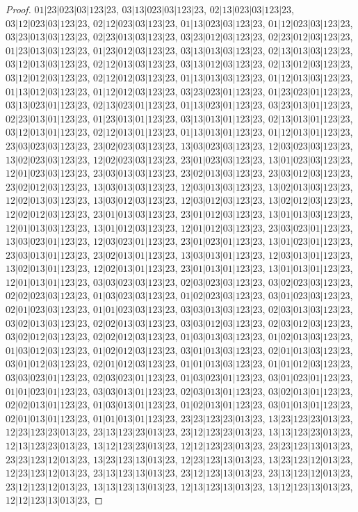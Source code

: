 \documentclass[12pt]{article}
\theoremstyle{plain}
\theoremstyle{definition}
\theoremstyle{remark}
\begin{document}
\begin{proof}
$01|23|023|03|123|23$, $03|13|023|03|123|23$, $02|13|023|03|123|23$, $03|12|023|03|123|23$, $02|12|023|03|123|23$, $01|13|023|03|123|23$, $01|12|023|03|123|23$, $03|23|013|03|123|23$, $02|23|013|03|123|23$, $03|23|012|03|123|23$, $02|23|012|03|123|23$, $01|23|013|03|123|23$, $01|23|012|03|123|23$, $03|13|013|03|123|23$, $02|13|013|03|123|23$, $03|12|013|03|123|23$, $02|12|013|03|123|23$, $03|13|012|03|123|23$, $02|13|012|03|123|23$, $03|12|012|03|123|23$, $02|12|012|03|123|23$, $01|13|013|03|123|23$, $01|12|013|03|123|23$, $01|13|012|03|123|23$, $01|12|012|03|123|23$, $03|23|023|01|123|23$, $01|23|023|01|123|23$, $03|13|023|01|123|23$, $02|13|023|01|123|23$, $01|13|023|01|123|23$, $03|23|013|01|123|23$, $02|23|013|01|123|23$, $01|23|013|01|123|23$, $03|13|013|01|123|23$, $02|13|013|01|123|23$, $03|12|013|01|123|23$, $02|12|013|01|123|23$, $01|13|013|01|123|23$, $01|12|013|01|123|23$, $23|03|023|03|123|23$, $23|02|023|03|123|23$, $13|03|023|03|123|23$, $12|03|023|03|123|23$, $13|02|023|03|123|23$, $12|02|023|03|123|23$, $23|01|023|03|123|23$, $13|01|023|03|123|23$, $12|01|023|03|123|23$, $23|03|013|03|123|23$, $23|02|013|03|123|23$, $23|03|012|03|123|23$, $23|02|012|03|123|23$, $13|03|013|03|123|23$, $12|03|013|03|123|23$, $13|02|013|03|123|23$, $12|02|013|03|123|23$, $13|03|012|03|123|23$, $12|03|012|03|123|23$, $13|02|012|03|123|23$, $12|02|012|03|123|23$, $23|01|013|03|123|23$, $23|01|012|03|123|23$, $13|01|013|03|123|23$, $12|01|013|03|123|23$, $13|01|012|03|123|23$, $12|01|012|03|123|23$, $23|03|023|01|123|23$, $13|03|023|01|123|23$, $12|03|023|01|123|23$, $23|01|023|01|123|23$, $13|01|023|01|123|23$, $23|03|013|01|123|23$, $23|02|013|01|123|23$, $13|03|013|01|123|23$, $12|03|013|01|123|23$, $13|02|013|01|123|23$, $12|02|013|01|123|23$, $23|01|013|01|123|23$, $13|01|013|01|123|23$, $12|01|013|01|123|23$, $03|03|023|03|123|23$, $02|03|023|03|123|23$, $03|02|023|03|123|23$, $02|02|023|03|123|23$, $01|03|023|03|123|23$, $01|02|023|03|123|23$, $03|01|023|03|123|23$, $02|01|023|03|123|23$, $01|01|023|03|123|23$, $03|03|013|03|123|23$, $02|03|013|03|123|23$, $03|02|013|03|123|23$, $02|02|013|03|123|23$, $03|03|012|03|123|23$, $02|03|012|03|123|23$, $03|02|012|03|123|23$, $02|02|012|03|123|23$, $01|03|013|03|123|23$, $01|02|013|03|123|23$, $01|03|012|03|123|23$, $01|02|012|03|123|23$, $03|01|013|03|123|23$, $02|01|013|03|123|23$, $03|01|012|03|123|23$, $02|01|012|03|123|23$, $01|01|013|03|123|23$, $01|01|012|03|123|23$, $03|03|023|01|123|23$, $02|03|023|01|123|23$, $01|03|023|01|123|23$, $03|01|023|01|123|23$, $01|01|023|01|123|23$, $03|03|013|01|123|23$, $02|03|013|01|123|23$, $03|02|013|01|123|23$, $02|02|013|01|123|23$, $01|03|013|01|123|23$, $01|02|013|01|123|23$, $03|01|013|01|123|23$, $02|01|013|01|123|23$, $01|01|013|01|123|23$, $23|23|123|23|013|23$, $13|23|123|23|013|23$, $12|23|123|23|013|23$, $23|13|123|23|013|23$, $23|12|123|23|013|23$, $13|13|123|23|013|23$, $12|13|123|23|013|23$, $13|12|123|23|013|23$, $12|12|123|23|013|23$, $23|23|123|13|013|23$, $23|23|123|12|013|23$, $13|23|123|13|013|23$, $12|23|123|13|013|23$, $13|23|123|12|013|23$, $12|23|123|12|013|23$, $23|13|123|13|013|23$, $23|12|123|13|013|23$, $23|13|123|12|013|23$, $23|12|123|12|013|23$, $13|13|123|13|013|23$, $12|13|123|13|013|23$, $13|12|123|13|013|23$, $12|12|123|13|013|23$, 
\end{proof}
\end{document}
